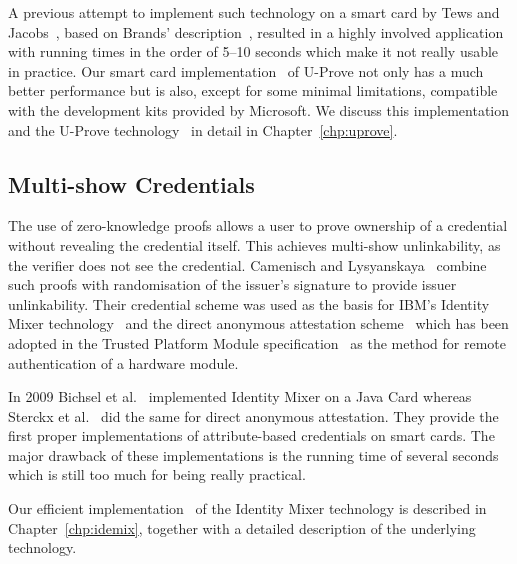 A previous attempt to implement such technology on a smart card by Tews and
Jacobs~\cite{TewsJacobs09}, based on Brands' description~\cite{Brands2000},
resulted in a highly involved application with running times in the order of
5--10 seconds which make it not really usable in practice. Our smart card
implementation~\cite{MostowskiVullers11} of U-Prove not only has a much better
performance but is also, except for some minimal limitations, compatible with
the development kits provided by Microsoft. We discuss this implementation and
the U-Prove technology~\cite{U-Prove_Crypto2013} in detail in
Chapter~\ref{chp:uprove}.

\subsection{Multi-show Credentials}

The use of zero-knowledge proofs allows a user to
prove ownership of a credential without revealing the credential itself. This
achieves multi-show unlinkability, as the verifier does not see the credential.
Camenisch and Lysyanskaya~\cite{CamenischLysyanskaya2001,CamenischLysyanskaya2003}
combine such proofs with randomisation of the issuer's signature to provide issuer unlinkability.
Their credential scheme was used as the basis for IBM's Identity Mixer
 technology~\cite{IdemixCrypto2012} and the direct
anonymous attestation
scheme~\cite{BrickellCC04} which has been adopted in the Trusted Platform Module
specification~\cite{TPM_1.2} as the method for remote authentication
 of a hardware module.

In 2009 Bichsel et al.~\cite{BichselCGS2009} implemented Identity Mixer
 on a Java Card whereas Sterckx et
al.~\cite{Sterckx09} did the same for direct anonymous attestation. They provide the first proper implementations of
attribute-based credentials on smart cards. The major drawback of these
implementations is the running time of several seconds which is still too much
for being really practical.

Our efficient implementation~\cite{VullersAlpar2013} of the Identity Mixer
 technology is described in Chapter~\ref{chp:idemix},
together with a detailed description of the underlying technology.

